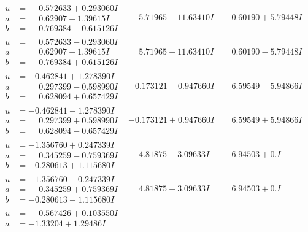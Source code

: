 \documentclass[1p]{elsarticle_modified}
\theoremstyle{definition}
\begin{document}
$$\begin{array}{c|c|c}
\begin{aligned}
u &= \phantom{-}0.572633 + 0.293060 I \\
a &= \phantom{-}0.62907 - 1.39615 I \\
b &= \phantom{-}0.769384 - 0.615126 I\end{aligned}
 & \phantom{-}5.71965 - 11.63410 I & \phantom{-}0.60190 + 5.79448 I \\ \hline\begin{aligned}
u &= \phantom{-}0.572633 - 0.293060 I \\
a &= \phantom{-}0.62907 + 1.39615 I \\
b &= \phantom{-}0.769384 + 0.615126 I\end{aligned}
 & \phantom{-}5.71965 + 11.63410 I & \phantom{-}0.60190 - 5.79448 I \\ \hline\begin{aligned}
u &= -0.462841 + 1.278390 I \\
a &= \phantom{-}0.297399 - 0.598990 I \\
b &= \phantom{-}0.628094 + 0.657429 I\end{aligned}
 & -0.173121 - 0.947660 I & \phantom{-}6.59549 - 5.94866 I \\ \hline\begin{aligned}
u &= -0.462841 - 1.278390 I \\
a &= \phantom{-}0.297399 + 0.598990 I \\
b &= \phantom{-}0.628094 - 0.657429 I\end{aligned}
 & -0.173121 + 0.947660 I & \phantom{-}6.59549 + 5.94866 I \\ \hline\begin{aligned}
u &= -1.356760 + 0.247339 I \\
a &= \phantom{-}0.345259 - 0.759369 I \\
b &= -0.280613 + 1.115680 I\end{aligned}
 & \phantom{-}4.81875 - 3.09633 I & \phantom{-}6.94503 + 0. I\phantom{ +0.000000I} \\ \hline\begin{aligned}
u &= -1.356760 - 0.247339 I \\
a &= \phantom{-}0.345259 + 0.759369 I \\
b &= -0.280613 - 1.115680 I\end{aligned}
 & \phantom{-}4.81875 + 3.09633 I & \phantom{-}6.94503 + 0. I\phantom{ +0.000000I} \\ \hline\begin{aligned}
u &= \phantom{-}0.567426 + 0.103550 I \\
a &= -1.33204 + 1.29486 I \\

\end{aligned}
\end{array}$$
\end{document}
